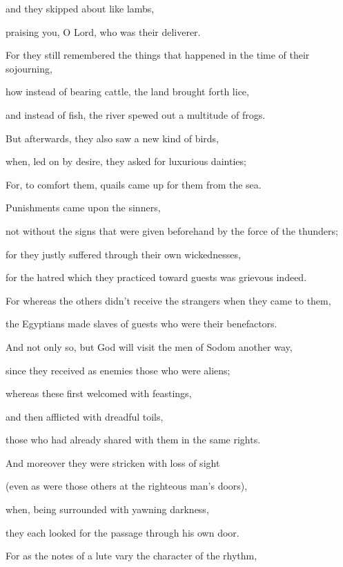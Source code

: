 {\par }{\QB and they skipped about like lambs,
\par }{\QB praising you, O Lord, who was their deliverer.
\par }{\Q {}For they still remembered the things that happened in the time of their sojourning,
\par }{\QB how instead of bearing cattle, the land brought forth lice,
\par }{\QB and instead of fish, the river spewed out a multitude of frogs.
\par }{\Q {}But afterwards, they also saw a new kind of birds,
\par }{\QB when, led on by desire, they asked for luxurious dainties;
\par }{\Q {}For, to comfort them, quails came up for them from the sea.
\par }{\BB \par }{\Q {}Punishments came upon the sinners,
\par }{\QB not without the signs that were given beforehand by the force of the thunders;
\par }{\QB for they justly suffered through their own wickednesses,
\par }{\QB for the hatred which they practiced toward guests was grievous indeed.
\par }{\Q {}For whereas the others didn’t receive the strangers when they came to them,
\par }{\QB the Egyptians made slaves of guests who were their benefactors.
\par }{\Q {}And not only so, but God will visit the men of Sodom another way,
\par }{\QB since they received as enemies those who were aliens;
\par }{\QB {}whereas these first welcomed with feastings,
\par }{\QB and then afflicted with dreadful toils,
\par }{\QB those who had already shared with them in the same rights.
\par }{\Q {}And moreover they were stricken with loss of sight
\par }{\QB (even as were those others at the righteous man’s doors),
\par }{\QB when, being surrounded with yawning darkness,
\par }{\QB they each looked for the passage through his own door.
\par }{\Q {}For as the notes of a lute vary the character of the rhythm,
}
